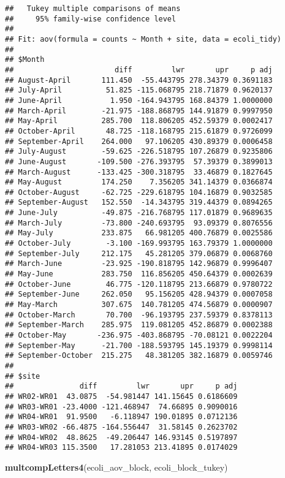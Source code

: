 \documentclass[]{book}
\newenvironment{Shaded}{\begin{snugshade}}{\end{snugshade}}
\newcommand{\KeywordTok}[1]{\textcolor[rgb]{0.13,0.29,0.53}{\textbf{#1}}}
\newcommand{\NormalTok}[1]{#1}
\theoremstyle{definition}
\theoremstyle{definition}
\theoremstyle{definition}
\theoremstyle{remark}
\begin{document}
\begin{verbatim}
##   Tukey multiple comparisons of means
##     95% family-wise confidence level
## 
## Fit: aov(formula = counts ~ Month + site, data = ecoli_tidy)
## 
## $Month
##                       diff         lwr       upr     p adj
## August-April       111.450  -55.443795 278.34379 0.3691183
## July-April          51.825 -115.068795 218.71879 0.9620137
## June-April           1.950 -164.943795 168.84379 1.0000000
## March-April        -21.975 -188.868795 144.91879 0.9997950
## May-April          285.700  118.806205 452.59379 0.0002417
## October-April       48.725 -118.168795 215.61879 0.9726099
## September-April    264.000   97.106205 430.89379 0.0006458
## July-August        -59.625 -226.518795 107.26879 0.9235806
## June-August       -109.500 -276.393795  57.39379 0.3899013
## March-August      -133.425 -300.318795  33.46879 0.1827645
## May-August         174.250    7.356205 341.14379 0.0366874
## October-August     -62.725 -229.618795 104.16879 0.9032585
## September-August   152.550  -14.343795 319.44379 0.0894265
## June-July          -49.875 -216.768795 117.01879 0.9689635
## March-July         -73.800 -240.693795  93.09379 0.8076556
## May-July           233.875   66.981205 400.76879 0.0025586
## October-July        -3.100 -169.993795 163.79379 1.0000000
## September-July     212.175   45.281205 379.06879 0.0068760
## March-June         -23.925 -190.818795 142.96879 0.9996407
## May-June           283.750  116.856205 450.64379 0.0002639
## October-June        46.775 -120.118795 213.66879 0.9780722
## September-June     262.050   95.156205 428.94379 0.0007058
## May-March          307.675  140.781205 474.56879 0.0000907
## October-March       70.700  -96.193795 237.59379 0.8378113
## September-March    285.975  119.081205 452.86879 0.0002388
## October-May       -236.975 -403.868795 -70.08121 0.0022204
## September-May      -21.700 -188.593795 145.19379 0.9998114
## September-October  215.275   48.381205 382.16879 0.0059746
## 
## $site
##               diff         lwr       upr     p adj
## WR02-WR01  43.0875  -54.981447 141.15645 0.6186609
## WR03-WR01 -23.4000 -121.468947  74.66895 0.9090016
## WR04-WR01  91.9500   -6.118947 190.01895 0.0712136
## WR03-WR02 -66.4875 -164.556447  31.58145 0.2623702
## WR04-WR02  48.8625  -49.206447 146.93145 0.5197897
## WR04-WR03 115.3500   17.281053 213.41895 0.0174029
\end{verbatim}

\begin{Shaded}
\begin{Highlighting}[]
\KeywordTok{multcompLetters4}\NormalTok{(ecoli_aov_block, ecoli_block_tukey)}
\end{Highlighting}
\end{Shaded}
\end{document}
